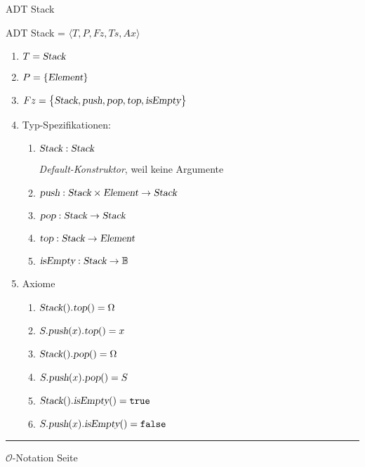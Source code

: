 \documentclass{slides}
\newcommand{\Oh}{\mathcal{O}}
\newcounter{mypage}
\begin{document}
\begin{slide}{}
\begin{center}
ADT Stack
\end{center}

\footnotesize
ADT Stack = $\langle T, P, Fz, Ts, Ax \rangle$
\begin{enumerate}
\item $T = \textsl{Stack}$
\item $P = \{ \textsl{Element} \}$
\item $Fz = \bigl\{ \textsl{Stack}, \textsl{push}, \textsl{pop}, \textsl{top}, \textsl{isEmpty} \bigr\}$
\item Typ-Spezifikationen:
      \begin{enumerate}
      \item $\textsl{Stack}: \textsl{Stack}$

            \emph{Default-Konstruktor}, weil keine Argumente
      \item $\textsl{push}: \textsl{Stack} \times \textsl{Element} \rightarrow \textsl{Stack}$
      \item $\textsl{pop}: \textsl{Stack}  \rightarrow \textsl{Stack}$
      \item $\textsl{top}: \textsl{Stack} \rightarrow \textsl{Element}$
      \item $\textsl{isEmpty}: \textsl{Stack} \rightarrow \mathbb{B}$
      \end{enumerate}
\item Axiome
      \begin{enumerate}
      \item $\textsl{Stack}().\textsl{top}() = \Omega$
      \item $S.\textsl{push}(x).\textsl{top}() = x$
      \item $\textsl{Stack}().\textsl{pop}() = \Omega$
      \item $S.\textsl{push}(x).\textsl{pop}() = S$
      \item $\textsl{Stack}().\textsl{isEmpty}() = \mathtt{true}$
      \item $S.\textsl{push}(x).\textsl{isEmpty}() = \mathtt{false}$
      \end{enumerate}
\end{enumerate}


\vspace*{\fill}
\tiny \addtocounter{mypage}{1}
\rule{17cm}{1mm}
$\Oh$-Notation  \hspace*{\fill} Seite 
\end{slide}
\end{document}
